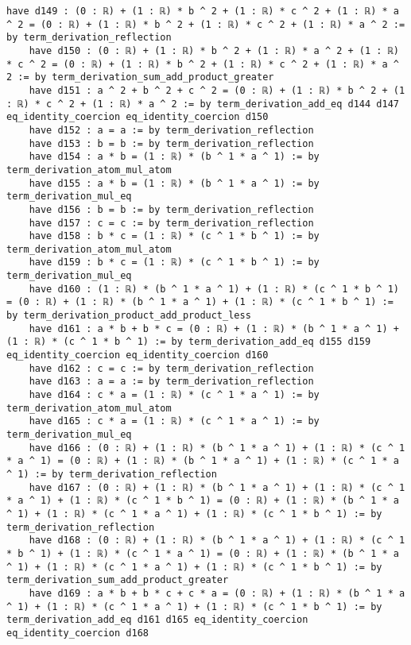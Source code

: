 \documentclass{article}
\begin{document}
\begin{tcolorbox}[colback=white!10, width=\linewidth]
\begin{lstlisting}[language=Lean4]
    have d149 : (0 : ℝ) + (1 : ℝ) * b ^ 2 + (1 : ℝ) * c ^ 2 + (1 : ℝ) * a ^ 2 = (0 : ℝ) + (1 : ℝ) * b ^ 2 + (1 : ℝ) * c ^ 2 + (1 : ℝ) * a ^ 2 := by term_derivation_reflection
    have d150 : (0 : ℝ) + (1 : ℝ) * b ^ 2 + (1 : ℝ) * a ^ 2 + (1 : ℝ) * c ^ 2 = (0 : ℝ) + (1 : ℝ) * b ^ 2 + (1 : ℝ) * c ^ 2 + (1 : ℝ) * a ^ 2 := by term_derivation_sum_add_product_greater
    have d151 : a ^ 2 + b ^ 2 + c ^ 2 = (0 : ℝ) + (1 : ℝ) * b ^ 2 + (1 : ℝ) * c ^ 2 + (1 : ℝ) * a ^ 2 := by term_derivation_add_eq d144 d147 eq_identity_coercion eq_identity_coercion d150
    have d152 : a = a := by term_derivation_reflection
    have d153 : b = b := by term_derivation_reflection
    have d154 : a * b = (1 : ℝ) * (b ^ 1 * a ^ 1) := by term_derivation_atom_mul_atom
    have d155 : a * b = (1 : ℝ) * (b ^ 1 * a ^ 1) := by term_derivation_mul_eq
    have d156 : b = b := by term_derivation_reflection
    have d157 : c = c := by term_derivation_reflection
    have d158 : b * c = (1 : ℝ) * (c ^ 1 * b ^ 1) := by term_derivation_atom_mul_atom
    have d159 : b * c = (1 : ℝ) * (c ^ 1 * b ^ 1) := by term_derivation_mul_eq
    have d160 : (1 : ℝ) * (b ^ 1 * a ^ 1) + (1 : ℝ) * (c ^ 1 * b ^ 1) = (0 : ℝ) + (1 : ℝ) * (b ^ 1 * a ^ 1) + (1 : ℝ) * (c ^ 1 * b ^ 1) := by term_derivation_product_add_product_less
    have d161 : a * b + b * c = (0 : ℝ) + (1 : ℝ) * (b ^ 1 * a ^ 1) + (1 : ℝ) * (c ^ 1 * b ^ 1) := by term_derivation_add_eq d155 d159 eq_identity_coercion eq_identity_coercion d160
    have d162 : c = c := by term_derivation_reflection
    have d163 : a = a := by term_derivation_reflection
    have d164 : c * a = (1 : ℝ) * (c ^ 1 * a ^ 1) := by term_derivation_atom_mul_atom
    have d165 : c * a = (1 : ℝ) * (c ^ 1 * a ^ 1) := by term_derivation_mul_eq
    have d166 : (0 : ℝ) + (1 : ℝ) * (b ^ 1 * a ^ 1) + (1 : ℝ) * (c ^ 1 * a ^ 1) = (0 : ℝ) + (1 : ℝ) * (b ^ 1 * a ^ 1) + (1 : ℝ) * (c ^ 1 * a ^ 1) := by term_derivation_reflection
    have d167 : (0 : ℝ) + (1 : ℝ) * (b ^ 1 * a ^ 1) + (1 : ℝ) * (c ^ 1 * a ^ 1) + (1 : ℝ) * (c ^ 1 * b ^ 1) = (0 : ℝ) + (1 : ℝ) * (b ^ 1 * a ^ 1) + (1 : ℝ) * (c ^ 1 * a ^ 1) + (1 : ℝ) * (c ^ 1 * b ^ 1) := by term_derivation_reflection
    have d168 : (0 : ℝ) + (1 : ℝ) * (b ^ 1 * a ^ 1) + (1 : ℝ) * (c ^ 1 * b ^ 1) + (1 : ℝ) * (c ^ 1 * a ^ 1) = (0 : ℝ) + (1 : ℝ) * (b ^ 1 * a ^ 1) + (1 : ℝ) * (c ^ 1 * a ^ 1) + (1 : ℝ) * (c ^ 1 * b ^ 1) := by term_derivation_sum_add_product_greater
    have d169 : a * b + b * c + c * a = (0 : ℝ) + (1 : ℝ) * (b ^ 1 * a ^ 1) + (1 : ℝ) * (c ^ 1 * a ^ 1) + (1 : ℝ) * (c ^ 1 * b ^ 1) := by term_derivation_add_eq d161 d165 eq_identity_coercion eq_identity_coercion d168

\end{lstlisting}
\end{tcolorbox}
\end{document}
